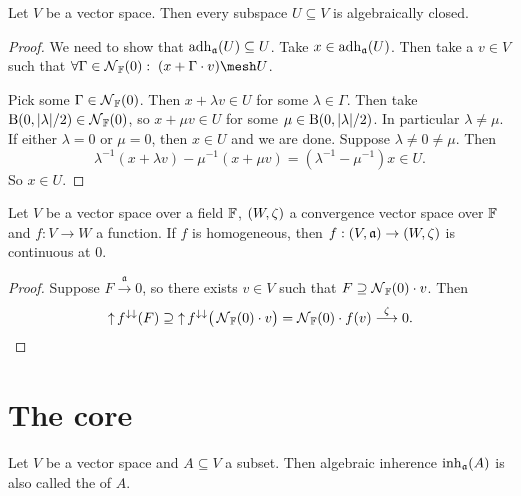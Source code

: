 \begin{lemma}
Let $V$ be a vector space. Then every subspace $U\subseteq V$ is algebraically closed.
\end{lemma}
\begin{proof}
We need to show that $\operatorname{adh}_\mathfrak{a}(U)\subseteq U$. Take $x\in \operatorname{adh}_\mathfrak{a}(U)$. Then take a $v\in V$ such that $\forall \Gamma\in\neighbourhood_\F(0):\; (x+\Gamma\cdot v)\mesh U$.

Pick some $\Gamma\in\operatorname{\mathcal{N}}_{\mathbb{F}}(0)$. Then $x+\lambda v\in U$ for some $\lambda\in \Gamma$. Then take $\operatorname{B}(0,|\lambda|/2)\in \operatorname{\mathcal{N}}_{\mathbb{F}}(0)$, so $x+\mu v\in U$ for some $\mu\in \operatorname{B}(0,|\lambda|/2)$. In particular $\lambda \neq \mu$. If either $\lambda =0$ or $\mu = 0$, then $x\in U$ and we are done. Suppose $\lambda\neq 0 \neq \mu$. Then
\[ \lambda^{-1}(x+\lambda v) - \mu^{-1}(x+\mu v) = (\lambda^{-1} - \mu^{-1})x \in U. \]
So $x\in U$.
\end{proof}

\begin{lemma}
Let $V$ be a vector space  over a field $\mathbb{F}$, $\sSet{W,\zeta}$ a convergence vector space over $\mathbb{F}$ and $f: V\to W$ a function. If $f$ is homogeneous, then $f: \sSet{V, \mathfrak{a}}\to \sSet{W,\zeta}$ is continuous at $0$.
\end{lemma}
\begin{proof}
Suppose $F\overset{\mathfrak{a}}{\longrightarrow} 0$, so there exists $v\in V$ such that $F\supseteq \operatorname{\mathcal{N}}_{\mathbb{F}}(0)\cdot v$. Then
\[ \operatorname{\uparrow} f^{\downarrow\downarrow}(F) \supseteq \operatorname{\uparrow} f^{\downarrow\downarrow}\big(\operatorname{\mathcal{N}}_{\mathbb{F}}(0)\cdot v\big) = \operatorname{\mathcal{N}}_{\mathbb{F}}(0)\cdot f(v) \overset{\zeta}{\longrightarrow} 0. \]
\end{proof}

\section{The core}
\begin{definition}
Let $V$ be a vector space and $A\subseteq V$ a subset. Then algebraic inherence $\operatorname{inh}_\mathfrak{a}(A)$ is also called the  of $A$.
\end{definition}

